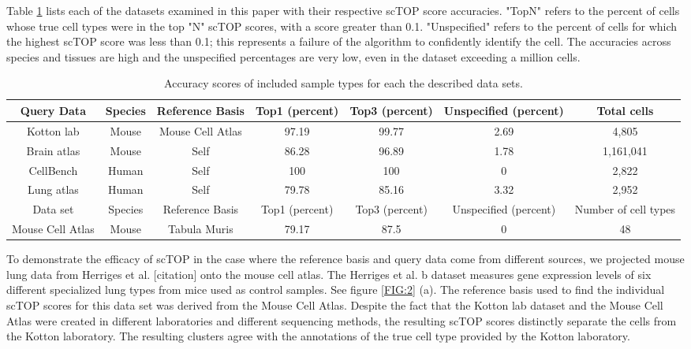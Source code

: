 \documentclass[aps,superscriptaddress, notitlepage,longbibliography]{revtex4-1}
\begin{document}
Table \ref{table:1} lists each of the datasets examined in this paper with their respective scTOP score accuracies. "TopN" refers to the percent of cells whose true cell types were in the top "N" scTOP scores, with a score greater than 0.1. "Unspecified" refers to the percent of cells for which the highest scTOP score was less than 0.1; this represents a failure of the algorithm to confidently identify the cell. The accuracies across species and tissues are high and the unspecified percentages are very low, even in the dataset exceeding a million cells.

\begin{table}[h!]
\centering
\begin{tabular}{| c | c | c | c | c | c | c |}
\hline
Query Data & Species & Reference Basis & Top1 (percent) & Top3 (percent) & Unspecified (percent) & Total cells \\ 
\hline
Kotton lab & Mouse & Mouse Cell Atlas & 97.19 & 99.77 & 2.69 & 4,805 \\ 
\hline
Brain atlas & Mouse & Self & 86.28 & 96.89 & 1.78 & 1,161,041 \\
\hline
CellBench & Human & Self & 100 & 100 & 0 & 2,822 \\
\hline
Lung atlas & Human & Self & 79.78 & 85.16 & 3.32 & 2,952 \\  
\hline
\hline
Data set & Species & Reference Basis & Top1 (percent) & Top3 (percent) & Unspecified (percent) & Number of cell types \\
\hline
Mouse Cell Atlas & Mouse & Tabula Muris & 79.17 & 87.5 & 0 & 48 \\
\hline

\end{tabular}
\caption{Accuracy scores of included sample types for each the described data sets.}
\label{table:1}
\end{table}

To demonstrate the efficacy of scTOP in the case where the reference basis and query data come from different sources, we projected mouse lung data from Herriges et al. [citation] onto the mouse cell atlas. The Herriges et al. b dataset  measures gene expression levels of six different specialized lung types from mice used as control samples. See figure \ref{FIG:2} (a). The reference basis used to find the individual scTOP scores for this data set was derived from the Mouse Cell Atlas. Despite the fact that the Kotton lab dataset and the Mouse Cell Atlas were created in different laboratories and different sequencing methods, the resulting scTOP scores distinctly separate the cells from the Kotton laboratory. The resulting clusters agree with the annotations of the true cell type provided by the Kotton laboratory.
\end{document}
